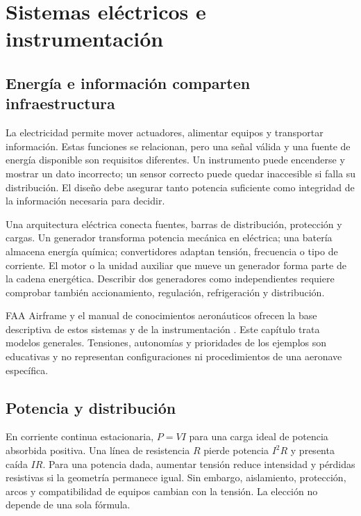 \chapter{Sistemas eléctricos e instrumentación}\label{ch:22}

\section{Energía e información comparten infraestructura}
La electricidad permite mover actuadores, alimentar equipos y transportar información. Estas funciones se relacionan, pero una señal válida y una fuente de energía disponible son requisitos diferentes. Un instrumento puede encenderse y mostrar un dato incorrecto; un sensor correcto puede quedar inaccesible si falla su distribución. El diseño debe asegurar tanto potencia suficiente como integridad de la información necesaria para decidir.

Una arquitectura eléctrica conecta fuentes, barras de distribución, protección y cargas. Un generador transforma potencia mecánica en eléctrica; una batería almacena energía química; convertidores adaptan tensión, frecuencia o tipo de corriente. El motor o la unidad auxiliar que mueve un generador forma parte de la cadena energética. Describir dos generadores como independientes requiere comprobar también accionamiento, regulación, refrigeración y distribución.

FAA Airframe y el manual de conocimientos aeronáuticos ofrecen la base descriptiva de estos sistemas y de la instrumentación \cite{FAA-AIRFRAME,PHAK}. Este capítulo trata modelos generales. Tensiones, autonomías y prioridades de los ejemplos son educativas y no representan configuraciones ni procedimientos de una aeronave específica.


\section{Potencia y distribución}
En corriente continua estacionaria, $P=VI$ para una carga ideal de potencia absorbida positiva. Una línea de resistencia $R$ pierde potencia $I^2R$ y presenta caída $IR$. Para una potencia dada, aumentar tensión reduce intensidad y pérdidas resistivas si la geometría permanece igual. Sin embargo, aislamiento, protección, arcos y compatibilidad de equipos cambian con la tensión. La elección no depende de una sola fórmula.

